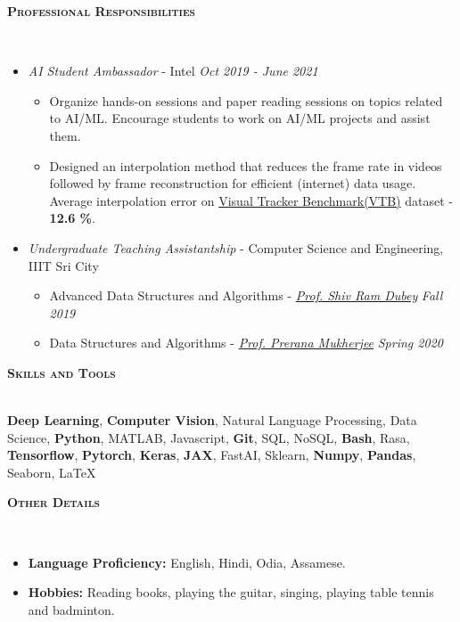 \documentclass[10pt]{article}
\renewcommand{\section}[1]{
\bigskip
  \begin{Large}
  {\textsc{\textbf{#1}}}
  \end{Large}
  \hrulefill
  \medskip
  \\
}
\newenvironment{lonemidlist}[1][\enskip\textbullet]%
        {\begin{itemize}[#1,leftmargin=*,parsep=0pt,itemsep=4pt,topsep=0pt,partopsep=0pt]}
        {\end{itemize}}
\begin{document}
\section{Professional Responsibilities}
\vspace{-4mm}
\begin{lonemidlist}

\item \textit{AI Student Ambassador} - Intel \hfill {\textit{Oct 2019 - June 2021}}
  \begin{itemize}
        \item Organize hands-on sessions and paper reading sessions on topics related to AI/ML. Encourage students to work on AI/ML projects and assist them.
        \item Designed an interpolation method that reduces the frame rate in videos followed by frame reconstruction for efficient (internet) data usage. Average interpolation error on \href{https://github.com/Debapriya-Tula/AdaConv-Pytorch}{Visual Tracker Benchmark(VTB)} dataset - \textbf{12.6 \%}.
  \end{itemize}
\item \textit{Undergraduate Teaching Assistantship} - Computer Science and Engineering, IIIT Sri City
  \begin{itemize}
        \item Advanced Data Structures and Algorithms - \href{https://profile.iiita.ac.in/srdubey/}{\textit{Prof. Shiv Ram Dubey}} \hfill{\textit{Fall 2019}}
        \item Data Structures and Algorithms - \href{https://mprerana.github.io/DrPreranaMukherjee/}{\textit{Prof. Prerana Mukherjee}} \hfill{\textit{Spring 2020}}
  \end{itemize}
\end{lonemidlist}
\vspace{1.0mm}

\section{Skills and Tools}
\textbf{Deep Learning}, \textbf{Computer Vision}, Natural Language Processing, Data Science, \textbf{Python}, MATLAB, Javascript, \textbf{Git}, SQL, NoSQL, \textbf{Bash}, Rasa, \textbf{Tensorflow}, \textbf{Pytorch}, \textbf{Keras}, \textbf{JAX}, FastAI, Sklearn, \textbf{Numpy}, \textbf{Pandas}, Seaborn, LaTeX
\vspace{1.0mm}

\section{Other Details}
\vspace{-4mm}
\begin{lonemidlist}

\item \textbf{Language Proficiency:} English, Hindi, Odia, Assamese.
\item \textbf{Hobbies:} Reading books, playing the guitar, singing, playing table tennis and badminton.
\end{lonemidlist}
\end{document}
